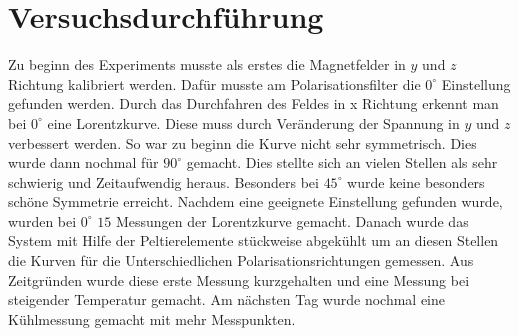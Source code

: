\section{Versuchsdurchführung}
Zu beginn des Experiments musste als erstes die Magnetfelder in $y$ und $z$ Richtung kalibriert werden. Dafür musste am Polarisationsfilter die $0^\circ$ Einstellung gefunden werden. Durch das Durchfahren des Feldes in x Richtung erkennt man bei $0^\circ$ eine Lorentzkurve. Diese muss durch Veränderung der Spannung in $y$ und $z$ verbessert werden. So war zu beginn die Kurve nicht sehr symmetrisch. Dies wurde dann nochmal für $90^\circ$ gemacht. Dies stellte sich an vielen Stellen als sehr schwierig und Zeitaufwendig heraus. Besonders bei $45^\circ$ wurde keine besonders schöne Symmetrie erreicht. Nachdem eine geeignete Einstellung gefunden wurde, wurden bei $0^\circ$ $15$ Messungen der Lorentzkurve gemacht. Danach wurde das System mit Hilfe der Peltierelemente stückweise abgekühlt um an diesen Stellen die Kurven für die Unterschiedlichen Polarisationsrichtungen gemessen. Aus Zeitgründen wurde diese erste Messung kurzgehalten und eine Messung bei steigender Temperatur gemacht. Am nächsten Tag wurde nochmal eine Kühlmessung gemacht mit mehr Messpunkten.   